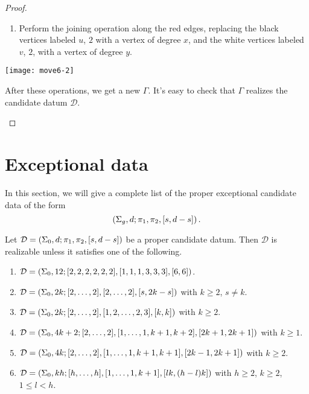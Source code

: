 \documentclass{article}
\begin{document}
\begin{proof}
\begin{manycases}
\begin{enumerate}
\item Perform the joining operation along the red edges, replacing the black vertices labeled $u$, $2$ with a vertex of degree $x$, and the white vertices labeled $v$, $2$, with a vertex of degree $y$.
\end{enumerate}
\begin{center}
\texttt{[image: move6-2]}
\end{center}
After these operations, we get a new \dessin{} $\Gamma$. It's easy to check that $\Gamma$ realizes the candidate datum $\mathcal{D}$.\qedhere
\end{manycases}
\end{proof}

\section{Exceptional data}
In this section, we will give a complete list of the proper exceptional candidate data of the form
\[
\left(\Sigma_g,d;\pi_1,\pi_2,[s,d-s]\right).
\]

\begin{theorem}\label{th:exceptional-n3-g0}
Let $\mathcal{D}=\left(\Sigma_0,d;\pi_1,\pi_2,[s,d-s]\right)$ be a proper candidate datum. Then $\mathcal{D}$ is realizable unless it satisfies one of the following.
\begin{enumerate}
\item $\mathcal{D}=\left(\Sigma_0,12;[2,2,2,2,2,2],[1,1,1,3,3,3],[6,6]\right)$.
\item $\mathcal{D}=\left(\Sigma_0,2k;[2,\ldots,2],[2,\ldots,2],[s,2k-s]\right)$ with $k\ge 2$, $s\neq k$.
\item $\mathcal{D}=\left(\Sigma_0,2k;[2,\ldots,2],[1,2,\ldots,2,3],[k,k]\right)$ with $k\ge2$.
\item $\mathcal{D}=\left(\Sigma_0,4k+2;[2,\ldots,2],[1,\ldots,1,k+1,k+2],[2k+1,2k+1]\right)$ with $k\ge 1$.
\item $\mathcal{D}=\left(\Sigma_0,4k;[2,\ldots,2],[1,\ldots,1,k+1,k+1],[2k-1,2k+1]\right)$ with $k\ge2$.
\item $\mathcal{D}=\left(\Sigma_0,kh;[h,\ldots,h],[1,\ldots,1,k+1],[lk,(h-l)k]\right)$ with $h\ge 2$, $k\ge 2$, $1\le l<h$.
\end{enumerate}
\end{theorem}
\end{document}

